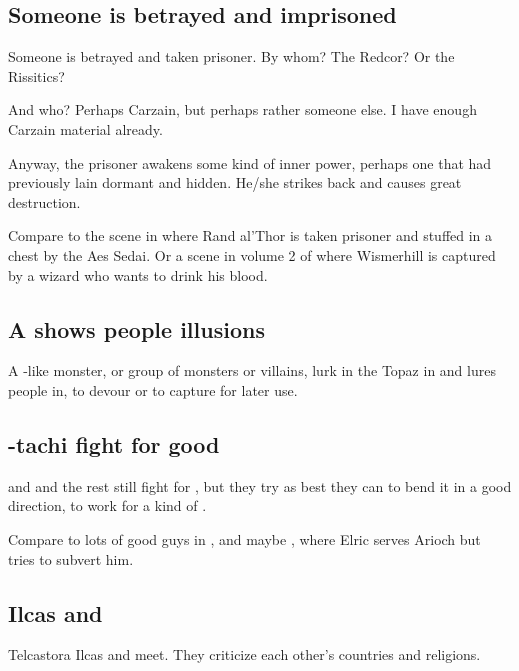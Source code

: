 \begin{garbage}
\subsection{Someone is betrayed and imprisoned}
Someone is betrayed and taken prisoner. By whom? The Redcor? Or the Rissitics?

And who? Perhaps Carzain, but perhaps rather someone else. I have enough Carzain material already. 

Anyway, the prisoner awakens some kind of inner power, perhaps one that had previously lain dormant and hidden. He/she strikes back and causes great destruction. 

Compare to the scene in  where Rand al'Thor is taken prisoner and stuffed in a chest by the Aes Sedai. Or a scene in volume 2 of \FLuneNoire{} where Wismerhill is captured by a wizard who wants to drink his blood. 







\subsection{A \succubus{} shows people illusions}
\index{\succubus}%
A \hs{\succubus}-like monster, or group of monsters or villains, lurk in the Topaz \Chateau{} in \Redce{} and lures people in, to devour or to capture for later use.







\subsection{\Dzasselid-tachi fight for good}
\Dzasselid{} and \Narkiza{} and the rest still fight for \Nechsain, but they try as best they can to bend it in a good direction, to work for a kind of .

Compare to lots of good guys in \cite{StevenEriksonIanCameronEsslemont:MalazanBookoftheFallen}, and maybe , where Elric serves Arioch but tries to subvert him. 







\subsection{Ilcas and \Narkiza}
Telcastora Ilcas and \Narkiza{} meet. 
They criticize each other's countries and religions. 


\end{garbage}
